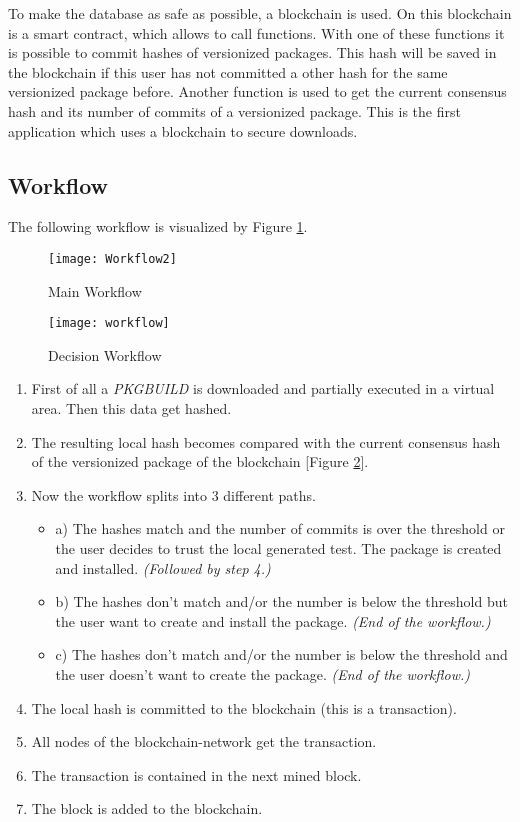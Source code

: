 To make the database as safe as possible, a blockchain is used. On this blockchain is a smart contract, which allows to call functions. With one of these functions it is possible to commit hashes of versionized packages. This hash will be saved in the blockchain if this user has not committed a other hash for the same versionized package before. Another function is used to get the current consensus hash and its number of commits of a versionized package. This is the first application which uses a blockchain to secure downloads.

\subsection*{Workflow}
The following workflow is visualized by Figure \ref{fig:main_workflow}.
\begin{figure}
	\centering
		\texttt{[image: Workflow2]}
	\caption{Main Workflow}
	\label{fig:main_workflow}
\end{figure}

\begin{figure}
	\centering
		\texttt{[image: workflow]}
	\caption{Decision Workflow}
	\label{fig:decision_workflow}
\end{figure}


\begin{enumerate}
	\item First of all a \textit{PKGBUILD} is downloaded and partially executed in a virtual area. Then this data get hashed. 
	\item The resulting local hash becomes compared with the current consensus hash of the versionized package of the blockchain [Figure \ref{fig:decision_workflow}]. 
	\item Now the workflow splits into 3 different paths.
	\begin{itemize}
		\item a) The hashes match and the number of commits is over the threshold or the user decides to trust the local generated test. The package is created and installed. \textit{(Followed by step 4.)}
		\item b) The hashes don't match and/or the number is below the threshold but the user want to create and install the package. \textit{(End of the workflow.)}
		\item c) The hashes don't match and/or the number is below the threshold and the user doesn't want to create the package. \textit{(End of the workflow.)}
	\end{itemize}
	\item The local hash is committed to the blockchain (this is a transaction).
	\item All nodes of the blockchain-network get the transaction.
	\item The transaction is contained in the next mined block.
	\item The block is added to the blockchain.
\end{enumerate}